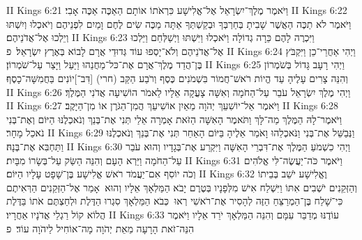 II Kings 6:21	וַיֹּאמֶר מֶלֶךְ־יִשְׂרָאֵל אֶל־אֱלִישָׁע כִּרְאֹתוֹ אוֹתָם הַאַכֶּה אַכֶּה אָבִי׃
II Kings 6:22	וַיֹּאמֶר לֹא תַכֶּה הַאֲשֶׁר שָׁבִיתָ בְּחַרְבְּךָ וּבְקַשְׁתְּךָ אַתָּה מַכֶּה שִׂים לֶחֶם וָמַיִם לִפְנֵיהֶם וְיֹאכְלוּ וְיִשְׁתּוּ וְיֵלְכוּ אֶל־אֲדֹנֵיהֶם׃
II Kings 6:23	וַיִּכְרֶה לָהֶם כֵּרָה גְדוֹלָה וַיֹּאכְלוּ וַיִּשְׁתּוּ וַיְשַׁלְּחֵם וַיֵּלְכוּ אֶל־אֲדֹנֵיהֶם וְלֹא־יָסְפוּ עוֹד גְּדוּדֵי אֲרָם לָבוֹא בְּאֶרֶץ יִשְׂרָאֵל׃ {פ}
II Kings 6:24	וַיְהִי אַחֲרֵי־כֵן וַיִּקְבֹּץ בֶּן־הֲדַד מֶלֶךְ־אֲרָם אֶת־כּל־מַחֲנֵהוּ וַיַּעַל וַיָּצַר עַל־שֹׁמְרוֹן׃
II Kings 6:25	וַיְהִי רָעָב גָּדוֹל בְּשֹׁמְרוֹן וְהִנֵּה צָרִים עָלֶיהָ עַד הֱיוֹת רֹאשׁ־חֲמוֹר בִּשְׁמֹנִים כֶּסֶף וְרֹבַע הַקַּב (חרי) [דִּב־]יוֹנִים בַּחֲמִשָּׁה־כָסֶף׃
II Kings 6:26	וַיְהִי מֶלֶךְ יִשְׂרָאֵל עֹבֵר עַל־הַחֹמָה וְאִשָּׁה צָעֲקָה אֵלָיו לֵאמֹר הוֹשִׁיעָה אֲדֹנִי הַמֶּלֶךְ׃
II Kings 6:27	וַיֹּאמֶר אַל־יוֹשִׁעֵךְ יְהֹוָה מֵאַיִן אוֹשִׁיעֵךְ הֲמִן־הַגֹּרֶן אוֹ מִן־הַיָּקֶב׃
II Kings 6:28	וַיֹּאמֶר־לָהּ הַמֶּלֶךְ מַה־לָּךְ וַתֹּאמֶר הָאִשָּׁה הַזֹּאת אָמְרָה אֵלַי תְּנִי אֶת־בְּנֵךְ וְנֹאכְלֶנּוּ הַיּוֹם וְאֶת־בְּנִי נֹאכַל מָחָר׃
II Kings 6:29	וַנְּבַשֵּׁל אֶת־בְּנִי וַנֹּאכְלֵהוּ וָאֹמַר אֵלֶיהָ בַּיּוֹם הָאַחֵר תְּנִי אֶת־בְּנֵךְ וְנֹאכְלֶנּוּ וַתַּחְבִּא אֶת־בְּנָהּ׃
II Kings 6:30	וַיְהִי כִשְׁמֹעַ הַמֶּלֶךְ אֶת־דִּבְרֵי הָאִשָּׁה וַיִּקְרַע אֶת־בְּגָדָיו וְהוּא עֹבֵר עַל־הַחֹמָה וַיַּרְא הָעָם וְהִנֵּה הַשַּׂק עַל־בְּשָׂרוֹ מִבָּיִת׃
II Kings 6:31	וַיֹּאמֶר כֹּה־יַעֲשֶׂה־לִּי אֱלֹהִים וְכֹה יוֹסִף אִם־יַעֲמֹד רֹאשׁ אֱלִישָׁע בֶּן־שָׁפָט עָלָיו הַיּוֹם׃
II Kings 6:32	וֶאֱלִישָׁע יֹשֵׁב בְּבֵיתוֹ וְהַזְּקֵנִים יֹשְׁבִים אִתּוֹ וַיִּשְׁלַח אִישׁ מִלְּפָנָיו בְּטֶרֶם יָבֹא הַמַּלְאָךְ אֵלָיו וְהוּא  אָמַר אֶל־הַזְּקֵנִים הַרְּאִיתֶם כִּי־שָׁלַח בֶּן־הַמְרַצֵּחַ הַזֶּה לְהָסִיר אֶת־רֹאשִׁי רְאוּ  כְּבֹא הַמַּלְאָךְ סִגְרוּ הַדֶּלֶת וּלְחַצְתֶּם אֹתוֹ בַּדֶּלֶת הֲלוֹא קוֹל רַגְלֵי אֲדֹנָיו אַחֲרָיו׃
II Kings 6:33	עוֹדֶנּוּ מְדַבֵּר עִמָּם וְהִנֵּה הַמַּלְאָךְ יֹרֵד אֵלָיו וַיֹּאמֶר הִנֵּה־זֹאת הָרָעָה מֵאֵת יְהֹוָה מָה־אוֹחִיל לַיהֹוָה עוֹד׃ {פ}
